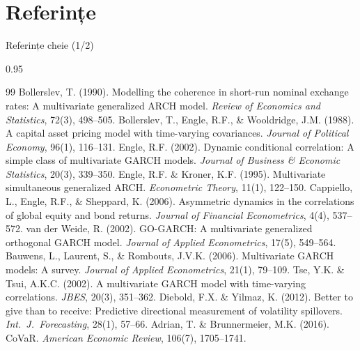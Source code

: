 \documentclass[9pt, aspectratio=169, t]{beamer}
\begin{document}
\section{Referințe}

\begin{frame}{Referințe cheie (1/2)}
    \begin{cminipage}{0.95\textwidth}
    \vspace{-3mm}
    {\tiny
    \begin{thebibliography}{99}\setlength{\itemsep}{0pt}
         Bollerslev, T. (1990). Modelling the coherence in short-run nominal exchange rates: A multivariate generalized ARCH model. \textit{Review of Economics and Statistics}, 72(3), 498--505.
         Bollerslev, T., Engle, R.F., \& Wooldridge, J.M. (1988). A capital asset pricing model with time-varying covariances. \textit{Journal of Political Economy}, 96(1), 116--131.
         Engle, R.F. (2002). Dynamic conditional correlation: A simple class of multivariate GARCH models. \textit{Journal of Business \& Economic Statistics}, 20(3), 339--350.
         Engle, R.F. \& Kroner, K.F. (1995). Multivariate simultaneous generalized ARCH. \textit{Econometric Theory}, 11(1), 122--150.
         Cappiello, L., Engle, R.F., \& Sheppard, K. (2006). Asymmetric dynamics in the correlations of global equity and bond returns. \textit{Journal of Financial Econometrics}, 4(4), 537--572.
         van der Weide, R. (2002). GO-GARCH: A multivariate generalized orthogonal GARCH model. \textit{Journal of Applied Econometrics}, 17(5), 549--564.
         Bauwens, L., Laurent, S., \& Rombouts, J.V.K. (2006). Multivariate GARCH models: A survey. \textit{Journal of Applied Econometrics}, 21(1), 79--109.
         Tse, Y.K. \& Tsui, A.K.C. (2002). A multivariate GARCH model with time-varying correlations. \textit{JBES}, 20(3), 351--362.
         Diebold, F.X. \& Yilmaz, K. (2012). Better to give than to receive: Predictive directional measurement of volatility spillovers. \textit{Int.\ J.\ Forecasting}, 28(1), 57--66.
         Adrian, T. \& Brunnermeier, M.K. (2016). CoVaR. \textit{American Economic Review}, 106(7), 1705--1741.
    \end{thebibliography}
    }
    \end{cminipage}
\end{frame}
\end{document}
